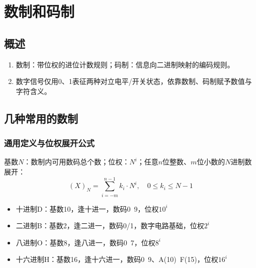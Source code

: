\chapter{数制和码制}
\section{概述}
\begin{enumerate}
    \item 数制：带位权的进位计数规则；码制：信息向二进制映射的编码规则。
    \item 数字信号仅用0、1表征两种对立电平/开关状态，依靠数制、码制赋予数值与字符含义。
\end{enumerate}

\section{几种常用的数制}
\subsection{通用定义与位权展开公式}
基数$N$：数制内可用数码总个数；位权：$N^i$；任意$n$位整数、$m$位小数的$N$进制数展开：
\[
(X)_N=\sum_{i=-m}^{n-1}k_i \cdot N^i,\quad 0\le k_i\le N-1
\]
\begin{itemize}
    \item 十进制D：基数10，逢十进一，数码0~9，位权$10^i$
    \item 二进制B：基数2，逢二进一，数码0/1，数字电路基础，位权$2^i$
    \item 八进制O：基数8，逢八进一，数码0~7，位权$8^i$
    \item 十六进制H：基数16，逢十六进一，数码0~9、A(10)~F(15)，位权$16^i$
\end{itemize}

